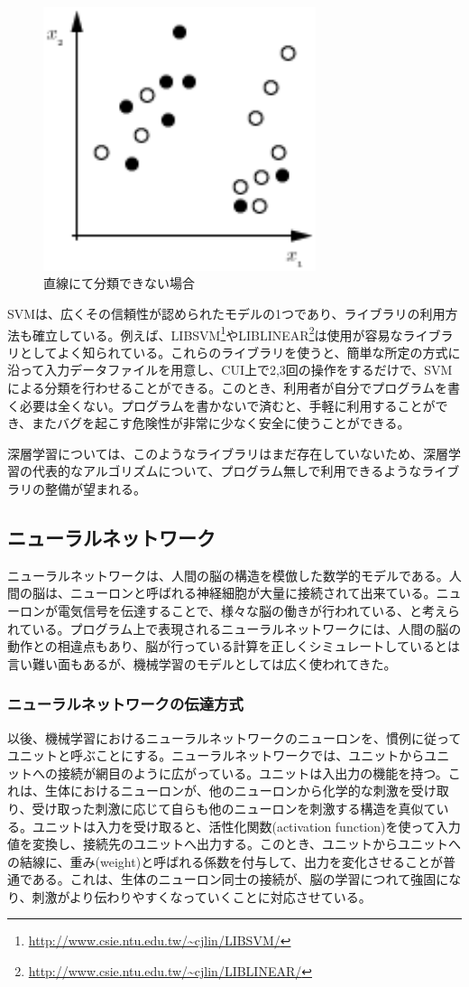 \begin{figure}[tbp]
 \centering
  \includegraphics[width=80mm]{img/c2/svm_mixed}
 \caption{直線にて分類できない場合}
 \label{c2_svm_mixed}
\end{figure}
SVMは、広くその信頼性が認められたモデルの1つであり、ライブラリの利用方法も確立している。例えば、LIBSVM\footnote{\url{http://www.csie.ntu.edu.tw/~cjlin/LIBSVM/}}やLIBLINEAR\footnote{\url{http://www.csie.ntu.edu.tw/~cjlin/LIBLINEAR/}}は使用が容易なライブラリとしてよく知られている。これらのライブラリを使うと、簡単な所定の方式に沿って入力データファイルを用意し、CUI上で2,3回の操作をするだけで、SVMによる分類を行わせることができる。このとき、利用者が自分でプログラムを書く必要は全くない。プログラムを書かないで済むと、手軽に利用することができ、またバグを起こす危険性が非常に少なく安全に使うことができる。\par
深層学習については、このようなライブラリはまだ存在していないため、深層学習の代表的なアルゴリズムについて、プログラム無しで利用できるようなライブラリの整備が望まれる。
\subsection{ニューラルネットワーク}
ニューラルネットワークは、人間の脳の構造を模倣した数学的モデルである。人間の脳は、ニューロンと呼ばれる神経細胞が大量に接続されて出来ている。ニューロンが電気信号を伝達することで、様々な脳の働きが行われている、と考えられている。プログラム上で表現されるニューラルネットワークには、人間の脳の動作との相違点もあり、脳が行っている計算を正しくシミュレートしているとは言い難い面もある\cite{kawato1998}が、機械学習のモデルとしては広く使われてきた。\par
\subsubsection{ニューラルネットワークの伝達方式}
以後、機械学習におけるニューラルネットワークのニューロンを、慣例に従ってユニットと呼ぶことにする。ニューラルネットワークでは、ユニットからユニットへの接続が網目のように広がっている。ユニットは入出力の機能を持つ。これは、生体におけるニューロンが、他のニューロンから化学的な刺激を受け取り、受け取った刺激に応じて自らも他のニューロンを刺激する構造を真似ている。ユニットは入力を受け取ると、活性化関数(activation function)を使って入力値を変換し、接続先のユニットへ出力する。このとき、ユニットからユニットへの結線に、重み(weight)と呼ばれる係数を付与して、出力を変化させることが普通である。これは、生体のニューロン同士の接続が、脳の学習につれて強固になり、刺激がより伝わりやすくなっていくことに対応させている。
